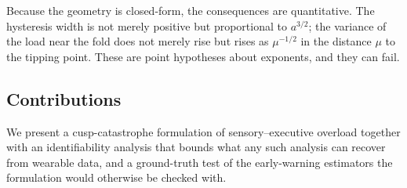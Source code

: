 \documentclass[conference]{IEEEtran}
\begin{document}
Because the geometry is closed-form, the consequences are quantitative. The
hysteresis width is not merely positive but proportional to $a^{3/2}$; the
variance of the load near the fold does not merely rise but rises as
$\mu^{-1/2}$ in the distance $\mu$ to the tipping point. These are point
hypotheses about exponents, and they can fail.

\subsection*{Contributions}

We present a cusp-catastrophe formulation of sensory--executive overload
together with an identifiability analysis that bounds what any such analysis
can recover from wearable data, and a ground-truth test of the early-warning
estimators the formulation would otherwise be checked with.
\end{document}
